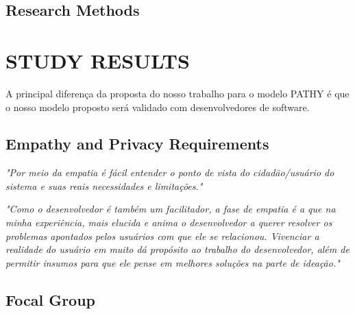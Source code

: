 \documentclass[conference]{IEEEtran}
\begin{document}
\subsection{Research Methods}


\section{STUDY RESULTS}
\label{empathy}


A principal diferença da proposta do nosso trabalho para o modelo PATHY é que o nosso modelo proposto será validado com desenvolvedores de software.

\subsection{Empathy and Privacy Requirements}

\begin{mq}
\emph{"Por meio da empatia é fácil entender o ponto de vista do cidadão/usuário do sistema e suas reais necessidades e limitações."}
\end{mq}

\begin{mq}
\emph{"Como o desenvolvedor é também um facilitador, a fase de empatia é a que na minha experiência, mais elucida e anima o desenvolvedor a querer resolver os problemas apontados pelos usuários com que ele se relacionou. Vivenciar a realidade do usuário em muito dá propósito ao trabalho do desenvolvedor, além de permitir insumos para que ele pense em melhores soluções na parte de ideação."}
\end{mq}



\subsection{Focal Group}


%
%
\end{document}
